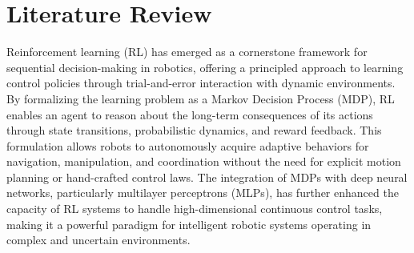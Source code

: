 \documentclass[english, 12pt, a4paper, elec, utf8, a-2b, online]{aaltothesis}
\begin{document}




\clearpage

\section{Literature Review}

Reinforcement learning (RL) has emerged as a cornerstone framework for sequential decision-making in robotics, offering a principled approach to learning control policies through trial-and-error interaction with dynamic environments. By formalizing the learning problem as a Markov Decision Process (MDP), RL enables an agent to reason about the long-term consequences of its actions through state transitions, probabilistic dynamics, and reward feedback. This formulation allows robots to autonomously acquire adaptive behaviors for navigation, manipulation, and coordination without the need for explicit motion planning or hand-crafted control laws. The integration of MDPs with deep neural networks, particularly multilayer perceptrons (MLPs), has further enhanced the capacity of RL systems to handle high-dimensional continuous control tasks, making it a powerful paradigm for intelligent robotic systems operating in complex and uncertain environments.
\end{document}
